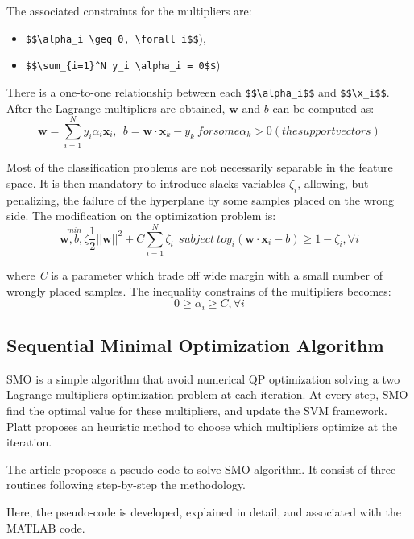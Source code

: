 \documentclass{ipol}
\def\x{{\mathbf x}}
\def\w{{\mathbf w}}
\begin{document}
The associated constraints for the multipliers are:
\begin{itemize}
\item \verb|$$\alpha_i \geq 0, \forall i$$|),
\item \verb|$$\sum_{i=1}^N y_i \alpha_i = 0$$|)
\end{itemize}

There is a one-to-one relationship between each \verb|$$\alpha_i$$| and \verb|$$\x_i$$|.
After the Lagrange multipliers are obtained, $\w$ and $b$ can be computed as:
\begin{equation}
\w = \sum_{i=1}^N y_i \alpha_i \x_i, \ \ b=\w \cdot \x_k - y_k \ for some \alpha_k > 0 (the support vectors)
\end{equation}

Most of the classification problems are not necessarily separable in the feature space.
It is then mandatory to introduce slacks variables $\zeta_i$, allowing, but penalizing, the failure of the hyperplane by some samples placed on the wrong side.
The modification on the optimization problem is:
\begin{equation}
\stackrel{min}{\w,b,\zeta} \frac{1}{2} ||\w||^2+C\sum_{i=1}^N \zeta_i \ \ subject \ to y_i(\w \cdot \x_i - b) \geq 1-\zeta_i, \forall i
\end{equation}

\noindent where \textit{C} is a parameter which trade off wide margin with a small number of wrongly placed samples.
The inequality constrains of the multipliers becomes:
\begin{equation}
0 \geq \alpha_i \geq C, \forall i
\end{equation}


\subsection{Sequential Minimal Optimization Algorithm}

SMO is a simple algorithm that avoid numerical QP optimization solving a two Lagrange multipliers optimization problem at each iteration.
At every step, SMO find the optimal value for these multipliers, and update the SVM framework.
Platt proposes an heuristic method to choose which multipliers optimize at the iteration.

The article \cite{Platt:1998} proposes a pseudo-code to solve SMO algorithm.
It consist of three routines following step-by-step the methodology.

Here, the pseudo-code is developed, explained in detail, and associated with the MATLAB code. 
\end{document}
